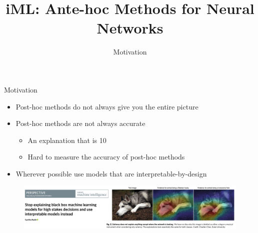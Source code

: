 \documentclass[11pt,compress,t,notes=noshow, aspectratio=169, xcolor=table]{beamer}
\title{iML: Ante-hoc Methods for Neural Networks}
\subtitle{Motivation}
\begin{document}
	\maketitle
	\graphicspath{ {./figure/} }

\begin{frame}{Motivation}
    \begin{itemize}
        \item Post-hoc methods do not always give you the entire picture
        \item Post-hoc methods are not always accurate
        \begin{itemize}
            \item An explanation that is 10%
            \item Hard to measure the accuracy of post-hoc methods
        \end{itemize}
        \item Wherever possible use models that are interpretable-by-design
    \end{itemize}
    \begin{figure}
        \centering
        \includegraphics[scale=.4]{bild1}
    \end{figure}
\end{frame}
\end{document}
